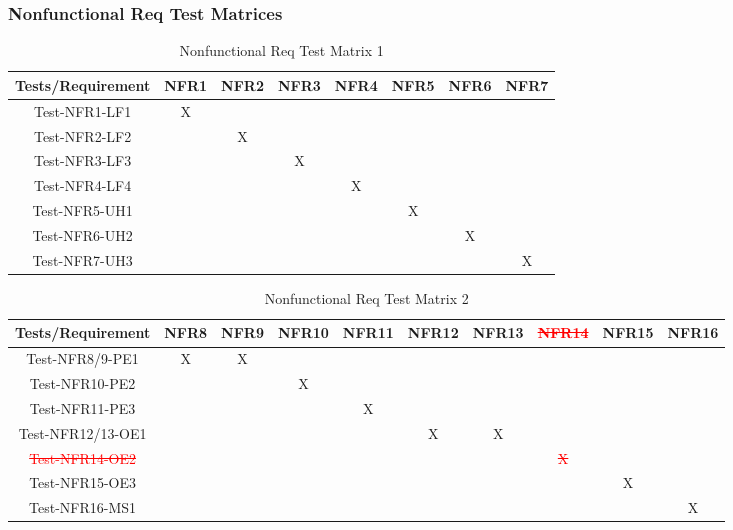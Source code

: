 \documentclass[12pt]{article}
\begin{document}
\subsubsection{Nonfunctional Req Test Matrices}
\begin{table}[htp]
\centering
\caption{Nonfunctional Req Test Matrix 1}
\begin{tabular}{|c|c|c|c|c|c|c|c|}
\hline
Tests/Requirement & NFR1 & NFR2 & NFR3 & NFR4 & NFR5 & NFR6 & NFR7 \\
\hline
Test-NFR1-LF1     & X    &      &      &      &      &      &      \\
\hline
Test-NFR2-LF2     &      & X    &      &      &      &      &      \\
\hline
Test-NFR3-LF3     &      &      & X    &      &      &      &      \\
\hline
Test-NFR4-LF4     &      &      &      & X    &      &      &      \\
\hline
Test-NFR5-UH1     &      &      &      &      & X    &      &      \\
\hline
Test-NFR6-UH2     &      &      &      &      &      & X    &      \\
\hline
Test-NFR7-UH3     &      &      &      &      &      &      & X\\
\hline   
\end{tabular}
\end{table}
\begin{table}[htp]
\centering
\caption{Nonfunctional Req Test Matrix 2}
\begin{tabular}{|c|c|c|c|c|c|c|c|c|c|}
\hline
Tests/Requirement & NFR8 & NFR9 & NFR10 & NFR11 & NFR12 & NFR13 & \textcolor{red}{\st{NFR14}} & NFR15 & NFR16 \\
\hline
Test-NFR8/9-PE1   & X    & X    &       &       &       &       &       &       &       \\
\hline
Test-NFR10-PE2    &      &      & X     &       &       &       &       &       &       \\
\hline
Test-NFR11-PE3    &      &      &       & X     &       &       &       &       &       \\
\hline
Test-NFR12/13-OE1 &      &      &       &       & X     & X     &       &       &       \\
\hline
\textcolor{red}{\st{Test-NFR14-OE2}}    &      &      &       &       &       &       & \textcolor{red}{\st{X}}     &       &       \\
\hline
Test-NFR15-OE3    &      &      &       &       &       &       &       & X     &       \\
\hline
Test-NFR16-MS1    &      &      &       &       &       &       &       &       & X    \\ \hline
\end{tabular}
\end{table}
\end{document}
